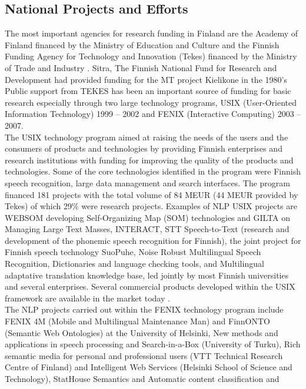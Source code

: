 \begin{multicols}{2}
\subsection{National Projects and Efforts}

The most important agencies for research funding in Finland are
the Academy of Finland financed by the Ministry of Education and
Culture and the Finnish Funding Agency for Technology and Innovation
(Tekes) financed by the Ministry of Trade and Industry \cite{Leading}.
Sitra, The Finnish National Fund for Research and Development had
provided funding for the MT project Kielikone in the 1980's Public
support from TEKES has been an important source of funding for basic
research especially through two large technology programs, USIX
(User-Oriented Information Technology) 1999 – 2002 and FENIX
(Interactive Computing) 2003 – 2007.\\
The USIX technology program aimed at raising the needs of the users and the
consumers of products and technologies by providing Finnish enterprises and
research institutions with funding for improving the quality of the products
and technologies. Some of the core technologies identified in the program were
Finnish speech recognition, large data management and search interfaces. The
program financed 181 projects with the total volume of 84 MEUR (44 MEUR
provided by Tekes) of which 29\% were research projects. Examples of NLP USIX
projects are WEBSOM developing Self-Organizing Map (SOM) technologies and GILTA
on Managing Large Text Masses, INTERACT, STT Speech-to-Text (research and
development of the phonemic speech recognition for Finnish), the joint project
for Finnish speech technology SuoPuhe, Noise Robust Multilingual Speech
Recognition, Dictionaries and language checking tools, and Multilingual
adaptative translation knowledge base, led jointly by most Finnish universities
and several enterprises. Several commercial products developed within the USIX
framework are available in the market today \cite{LoppuUSIX}.\\
The NLP projects carried out within the FENIX technology program include FENIX
4M (Mobile and Multilingual Maintenance Man) and FinnONTO (Semantic Web
Ontologies) at the University of Helsinki, New methods and applications in
speech processing and Search-in-a-Box (University of Turku), Rich semantic
media for personal and professional users (VTT Technical Research Centre of
Finland) and Intelligent Web Services (Helsinki School of Science and
Technology), StatHouse Semantics and Automatic content classification and

\end{multicols}
